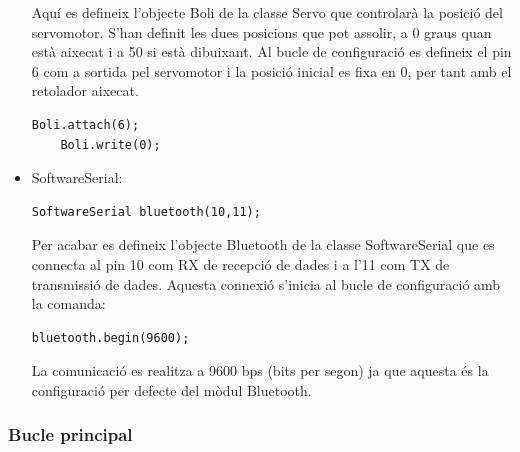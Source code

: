\begin{itemize}
	Aquí es defineix l’objecte Boli de la classe Servo que controlarà la posició del servomotor. S’han definit les dues posicions que pot assolir, a 0 graus quan està aixecat i a 50 si està dibuixant. Al bucle de configuració es defineix el pin 6 com a sortida pel servomotor i la posició inicial es fixa en 0, per tant amb el retolador aixecat.
	\begin{lstlisting}[style=Arduino]
	Boli.attach(6);
	Boli.write(0);
	\end{lstlisting}
	
	\item SoftwareSerial:
	\begin{lstlisting}[style=Arduino]
	SoftwareSerial bluetooth(10,11);
	\end{lstlisting}
	
	Per acabar es defineix l’objecte Bluetooth de la classe SoftwareSerial que es connecta al pin 10 com RX de recepció de dades i a l’11 com TX de transmissió de dades. Aquesta connexió s’inicia al bucle de configuració amb la comanda: 
	\begin{lstlisting}[style=Arduino]
	bluetooth.begin(9600);
	\end{lstlisting}
	
	La comunicació es realitza a 9600 bps (bits per segon) ja que aquesta és la configuració per defecte del mòdul Bluetooth. 
	
	
\end{itemize}


\subsubsection{Bucle principal}

